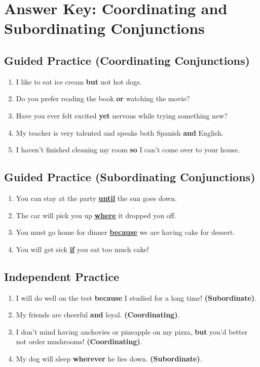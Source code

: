 \documentclass[12pt]{article}
\begin{document}
\section*{Answer Key: Coordinating and Subordinating Conjunctions}

\subsection*{Guided Practice (Coordinating Conjunctions)}
\begin{enumerate}
    \item I like to eat ice cream \textbf{but} not hot dogs.
    \item Do you prefer reading the book \textbf{or} watching the movie?
    \item Have you ever felt excited \textbf{yet} nervous while trying something new?
    \item My teacher is very talented and speaks both Spanish \textbf{and} English.
    \item I haven't finished cleaning my room \textbf{so} I can't come over to your house.
\end{enumerate}

\subsection*{Guided Practice (Subordinating Conjunctions)}
\begin{enumerate}
    \item You can stay at the party \underline{\textbf{until}} the sun goes down.
    \item The car will pick you up \underline{\textbf{where}} it dropped you off.
    \item You must go home for dinner \underline{\textbf{because}} we are having cake for dessert.
    \item You will get sick \underline{\textbf{if}} you eat too much cake!
\end{enumerate}

\subsection*{Independent Practice}
\begin{enumerate}
    \item I will do well on the test \textbf{because} I studied for a long time! \textbf{(Subordinate)}.
    \item My friends are cheerful \textbf{and} loyal. \textbf{(Coordinating)}.
    \item I don't mind having anchovies or pineapple on my pizza, \textbf{but} you'd better not order mushrooms! \textbf{(Coordinating)}.
    \item My dog will sleep \textbf{wherever} he lies down. \textbf{(Subordinate)}.
\end{enumerate}
\end{document}
